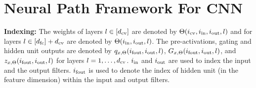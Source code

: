 \section{Neural Path Framework For CNN}\label{sec:cnpf}
\textbf{Indexing:} The weights of layers $l\in[d_{\text{cv}}]$ are denoted by $\Theta(i_{\text{cv}},i_{\text{in}},i_{\text{out}},l)$ and for layers $l\in[d_{\text{fc}}]+d_{\text{cv}}$ are denoted by $\Theta(i_{\text{in}},i_{\text{out}},l)$. The pre-activations, gating and hidden unit outputs are denoted by $q_{x,\Theta}(i_{\text{fout}},i_{\text{out}},l)$,  $G_{x,\Theta}(i_{\text{fout}},i_{\text{out}},l)$, and $z_{x,\Theta}(i_{\text{fout}},i_{\text{out}},l)$ for layers $l=1,\ldots, d_{\text{cv}}$. $i_{\text{in}}$ and $i_{\text{out}}$ are used to index the input and the output filters. $i_{\text{fout}}$ is used to denote the index of hidden unit (in the feature dimension) within the input and output filters. %


